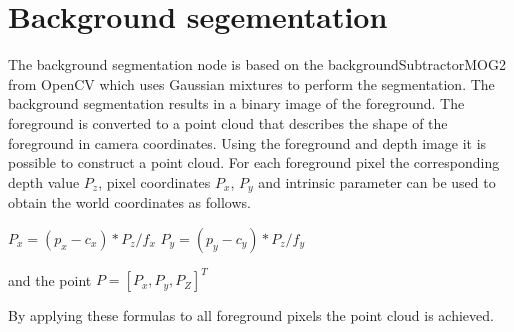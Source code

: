 \section*{Background segementation}

The background segmentation node is based on the backgroundSubtractorMOG2 from OpenCV \cite{BGS} which uses Gaussian mixtures to perform the segmentation. The background segmentation results in a binary image of the foreground. The foreground is converted to a point cloud that describes the shape of the foreground in camera coordinates. Using the foreground and depth image it is possible to construct a point cloud. For each foreground pixel the corresponding depth value $P_z$, pixel coordinates $P_x$, $P_y$ and intrinsic parameter can be used to obtain the world coordinates as follows.

$P_x = (p_x - c_x) * P_z / f_x$
$P_y = (p_y - c_y) * P_z / f_y$

and the point $P = [P_x, P_y, P_Z]^T$

By applying these formulas to all foreground pixels the point cloud is achieved.


